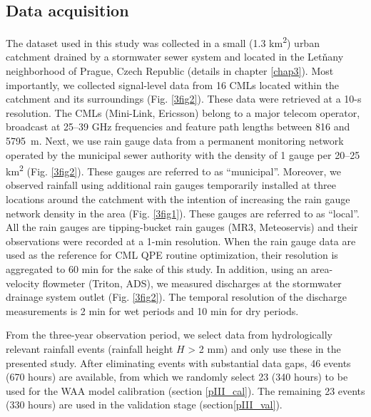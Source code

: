 \documentclass{ctuthesis}\usepackage[]{graphicx}\usepackage[]{color}
\begin{document}
\subsection{Data acquisition} \label{dataAcq}
The dataset used in this study was collected in a small (1.3 km\textsuperscript{2}) urban catchment drained by a stormwater sewer system and located in the Letňany neighborhood of Prague, Czech Republic (details in chapter \ref{chap3}). Most importantly, we collected signal-level data from 16 CMLs located within the catchment and its surroundings (Fig. \ref{3fig2}). These data were retrieved at a 10-s resolution. The CMLs (Mini-Link, Ericsson) belong to a major telecom operator, broadcast at 25–39 GHz frequencies and feature path lengths between 816 and 5795~m. Next, we use rain gauge data from a permanent monitoring network operated by the municipal sewer authority with the density of 1 gauge per 20–25 km\textsuperscript{2} (Fig. \ref{3fig2}). These gauges are referred to as “municipal”. Moreover, we observed rainfall using additional rain gauges temporarily installed at three locations around the catchment with the intention of increasing the rain gauge network density in the area (Fig. \ref{3fig1}). These gauges are referred to as “local”. All the rain gauges are tipping-bucket rain gauges (MR3, Meteoservis) and their observations were recorded at a 1-min resolution. When the rain gauge data are used as the reference for CML QPE routine optimization, their resolution is aggregated to 60 min for the sake of this study. In addition, using an area-velocity flowmeter (Triton, ADS), we measured discharges at the stormwater drainage system outlet (Fig. \ref{3fig2}). The temporal resolution of the discharge measurements is 2 min for wet periods and 10 min for dry periods.

From the three-year observation period, we select data from hydrologically relevant rainfall events (rainfall height $H$ > 2 mm) and only use these in the presented study. After eliminating events with substantial data gaps, 46 events (670 hours) are available, from which we randomly select 23 (340 hours) to be used for the WAA model calibration (section \ref{pIII_cal}). The remaining 23 events (330 hours) are used in the validation stage (section\ref{pIII_val}).
\end{document}
